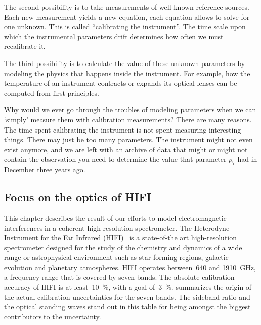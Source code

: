 The second possibility is to take measurements of well known reference sources.
Each new measurement yields a new equation, each equation allows to solve for one unknown.
This is called ``calibrating the instrument''.
The time scale upon which the instrumental parameters drift determines how often we must recalibrate it.

The third possibility is to calculate the value of these unknown parameters by modeling the physics that happens inside the instrument.
For example, how the temperature of an instrument contracts or expands its optical lenses can be computed from first principles.

Why would we ever go through the troubles of modeling parameters when we can `simply' measure them with calibration measurements?
There are many reasons.
The time spent calibrating the instrument is not spent measuring interesting things.
There may just be too many parameters.
The instrument might not even exist anymore, and we are left with an archive of data that might or might not contain the observation you need to determine the value that parameter $p_7$ had in December three years ago.

\subsection{Focus on the optics of HIFI}

This chapter describes the result of our efforts to model electromagnetic interferences in a coherent high-resolution spectrometer.
The Heterodyne Instrument for the Far Infrared (HIFI)~\cite{AA_518_L6} is a state-of-the art high-resolution spectrometer designed for the study of the chemistry and dynamics of a wide range or astrophysical environment such as star forming regions, galactic evolution and planetary atmospheres.
HIFI operates between~\num{640} and \SI{1910}{\giga\hertz}, a frequency range that is covered by seven bands.
The absolute calibration accuracy of HIFI is at least~\SI{10}{\percent}, with a goal of~\SI{3}{\percent}.
 summarizes the origin of the actual calibration uncertainties for the seven bands.
The sideband ratio and the optical standing waves stand out in this table for being amongst the biggest contributors to the uncertainty.

